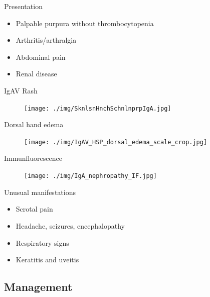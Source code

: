 \begin{frame}{Presentation}

\begin{itemize}
\itemsep1pt\parskip0pt
\item
  Palpable purpura without thrombocytopenia
\item
  Arthritis/arthralgia
\item
  Abdominal pain
\item
  Renal disease
\end{itemize}

\end{frame}

\begin{frame}{IgAV Rash}

\begin{figure}
\texttt{[image: ./img/SknlsnHnchSchnlnprpIgA.jpg]}
\end{figure}

\end{frame}

\begin{frame}{Dorsal hand edema}

\begin{figure}
\texttt{[image: ./img/IgAV\_HSP\_dorsal\_edema\_scale\_crop.jpg]}
\end{figure}

\end{frame}

\begin{frame}{Immunfluorescence}

\begin{figure}
\texttt{[image: ./img/IgA\_nephropathy\_IF.jpg]}
\end{figure}

\end{frame}

\begin{frame}{Unusual manifestations}

\begin{itemize}
\itemsep1pt\parskip0pt
\item
  Scrotal pain
\item
  Headache, seizures, encephalopathy
\item
  Respiratory signs
\item
  Keratitis and uveitis
\end{itemize}

\end{frame}

\subsection{Management}\label{management}

